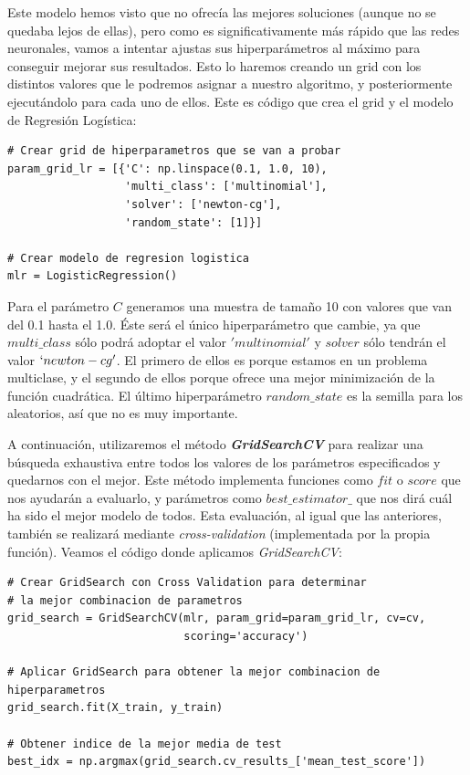 \documentclass[11pt,a4paper]{article}
\begin{document}
Este modelo hemos visto que no ofrecía las mejores soluciones (aunque no se quedaba lejos de ellas), pero como es significativamente más rápido que las redes neuronales, vamos a intentar ajustas sus hiperparámetros al máximo para conseguir mejorar sus resultados. Esto lo haremos creando un grid con los distintos valores que le podremos asignar a nuestro algoritmo, y posteriormente ejecutándolo para cada uno de ellos. Este es código que crea el grid y el modelo de Regresión Logística:

\begin{lstlisting}
# Crear grid de hiperparametros que se van a probar
param_grid_lr = [{'C': np.linspace(0.1, 1.0, 10),
                  'multi_class': ['multinomial'],
                  'solver': ['newton-cg'],
                  'random_state': [1]}]

# Crear modelo de regresion logistica
mlr = LogisticRegression()
\end{lstlisting}

Para el parámetro $C$ generamos una muestra de tamaño 10 con valores que van del 0.1 hasta el 1.0. Éste será el único hiperparámetro que cambie, ya que $multi\_class$ sólo podrá adoptar el valor $'multinomial'$ y $solver$ sólo tendrán el valor $`newton-cg'$. El primero de ellos es porque estamos en un problema multiclase, y el segundo de ellos porque ofrece una mejor minimización de la función cuadrática. El último hiperparámetro $random\_state$ es la semilla para los aleatorios, así que no es muy importante.

A continuación, utilizaremos el método \textbf{\textit{GridSearchCV}}\cite{GridSearchCV} para realizar una búsqueda exhaustiva entre todos los valores de los parámetros especificados y quedarnos con el mejor. Este método implementa funciones como $fit$ o $score$ que nos ayudarán a evaluarlo, y parámetros como $best\_estimator\_$ que nos dirá cuál ha sido el mejor modelo de todos. Esta evaluación, al igual que las anteriores, también se realizará mediante \textit{cross-validation} (implementada por la propia función). Veamos el código donde aplicamos \textit{GridSearchCV}:

\begin{lstlisting}
# Crear GridSearch con Cross Validation para determinar
# la mejor combinacion de parametros
grid_search = GridSearchCV(mlr, param_grid=param_grid_lr, cv=cv,
                           scoring='accuracy')

# Aplicar GridSearch para obtener la mejor combinacion de hiperparametros
grid_search.fit(X_train, y_train)

# Obtener indice de la mejor media de test
best_idx = np.argmax(grid_search.cv_results_['mean_test_score'])

\end{lstlisting}
\end{document}
